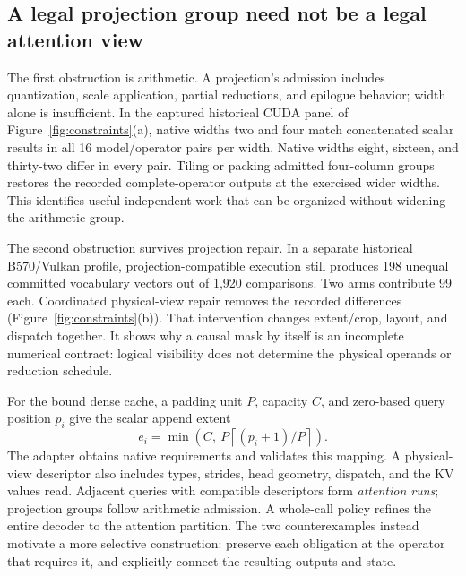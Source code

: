 \subsection{A legal projection group need not be a legal attention view}
The first obstruction is arithmetic. A projection's admission includes quantization, scale application, partial reductions, and epilogue behavior; width alone is insufficient. In the captured historical CUDA panel of Figure~\ref{fig:constraints}(a), native widths two and four match concatenated scalar results in all 16 model/operator pairs per width. Native widths eight, sixteen, and thirty-two differ in every pair. Tiling or packing admitted four-column groups restores the recorded complete-operator outputs at the exercised wider widths. This identifies useful independent work that can be organized without widening the arithmetic group.

The second obstruction survives projection repair. In a separate historical B570/Vulkan profile, projection-compatible execution still produces 198 unequal committed vocabulary vectors out of 1,920 comparisons. Two arms contribute 99 each. Coordinated physical-view repair removes the recorded differences (Figure~\ref{fig:constraints}(b)). That intervention changes extent/crop, layout, and dispatch together. It shows why a causal mask by itself is an incomplete numerical contract: logical visibility does not determine the physical operands or reduction schedule.


For the bound dense cache, a padding unit $P$, capacity $C$, and zero-based query position $p_i$ give the scalar append extent
\begin{equation}
 e_i=\min\!\left(C,\ P\left\lceil(p_i+1)/P\right\rceil\right).
 \label{eq:extent}
\end{equation}
The adapter obtains native requirements and validates this mapping. A physical-view descriptor also includes types, strides, head geometry, dispatch, and the KV values read. Adjacent queries with compatible descriptors form \emph{attention runs}; projection groups follow arithmetic admission. A whole-call policy refines the entire decoder to the attention partition. The two counterexamples instead motivate a more selective construction: preserve each obligation at the operator that requires it, and explicitly connect the resulting outputs and state.
